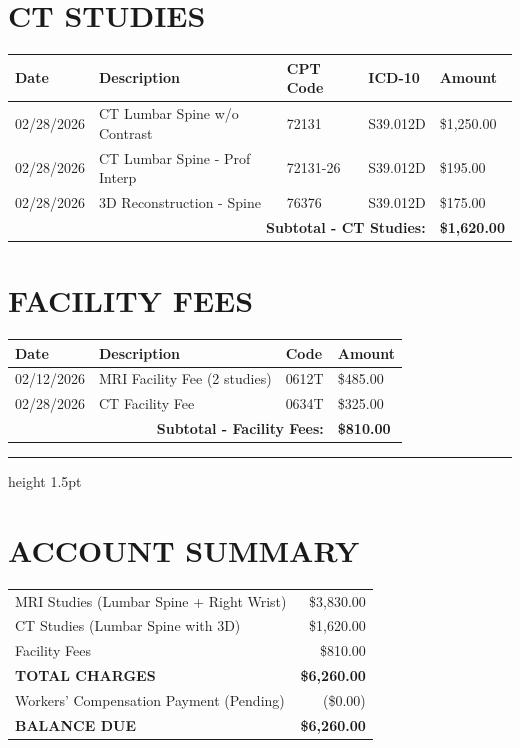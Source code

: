 \documentclass[11pt]{article}
\begin{document}
\section*{CT STUDIES}

\begin{longtable}{@{}p{2cm}p{5.5cm}p{2cm}p{2cm}p{2.5cm}@{}}
\toprule
\textbf{Date} & \textbf{Description} & \textbf{CPT Code} & \textbf{ICD-10} & \textbf{Amount} \\
\midrule
\endhead

02/28/2026 & CT Lumbar Spine w/o Contrast & 72131 & S39.012D & \$1,250.00 \\
02/28/2026 & CT Lumbar Spine - Prof Interp & 72131-26 & S39.012D & \$195.00 \\
02/28/2026 & 3D Reconstruction - Spine & 76376 & S39.012D & \$175.00 \\
\midrule
\multicolumn{4}{r}{\textbf{Subtotal - CT Studies:}} & \textbf{\$1,620.00} \\
\bottomrule
\end{longtable}

\section*{FACILITY FEES}

\begin{longtable}{@{}p{2cm}p{8cm}p{2.5cm}p{2.5cm}@{}}
\toprule
\textbf{Date} & \textbf{Description} & \textbf{Code} & \textbf{Amount} \\
\midrule
\endhead

02/12/2026 & MRI Facility Fee (2 studies) & 0612T & \$485.00 \\
02/28/2026 & CT Facility Fee & 0634T & \$325.00 \\
\midrule
\multicolumn{3}{r}{\textbf{Subtotal - Facility Fees:}} & \textbf{\$810.00} \\
\bottomrule
\end{longtable}

\vspace{1em}
\hrule height 1.5pt
\vspace{0.5em}

\section*{ACCOUNT SUMMARY}

\begin{tabular}{@{}p{10cm}r@{}}
MRI Studies (Lumbar Spine + Right Wrist) & \$3,830.00 \\
CT Studies (Lumbar Spine with 3D) & \$1,620.00 \\
Facility Fees & \$810.00 \\
\midrule
\textbf{TOTAL CHARGES} & \textbf{\$6,260.00} \\
\midrule
Workers' Compensation Payment (Pending) & (\$0.00) \\
\textbf{BALANCE DUE} & \textbf{\$6,260.00} \\
\end{tabular}
\end{document}
